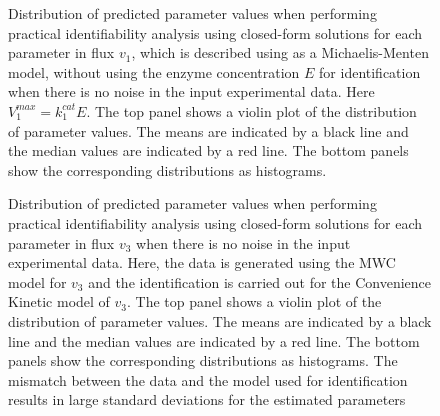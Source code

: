 \documentclass[10pt]{article}
\begin{document}
\begin{figure}[!tbhp]
	\caption{Distribution of predicted parameter values when performing practical identifiability analysis using closed-form solutions for each parameter in flux $v_1$, which is described using as a Michaelis-Menten model, without using the enzyme concentration $E$ for identification when there is no noise in the input experimental data. Here $V_1^{max} = k_1^{cat}E$. The top panel shows a violin plot of the distribution of parameter values. The means are indicated by a black line and the median values are indicated by a red line. The bottom panels show the corresponding distributions as histograms.}\label{fig:v5_v1max_ck_values}
\end{figure}

\begin{figure}[!tbhp]
	\caption{Distribution of predicted parameter values when performing practical identifiability analysis using closed-form solutions for each parameter in flux $v_3$ when there is no noise in the input experimental data. Here, the data is generated using the MWC model for $v_3$ and the identification is carried out for the Convenience Kinetic model of $v_3$. The top panel shows a violin plot of the distribution of parameter values. The means are indicated by a black line and the median values are indicated by a red line. The bottom panels show the corresponding distributions as histograms. The mismatch between the data and the model used for identification results in large standard deviations for the estimated parameters}\label{fig:v3_mwc_ck_values}
\end{figure}
\end{document}
